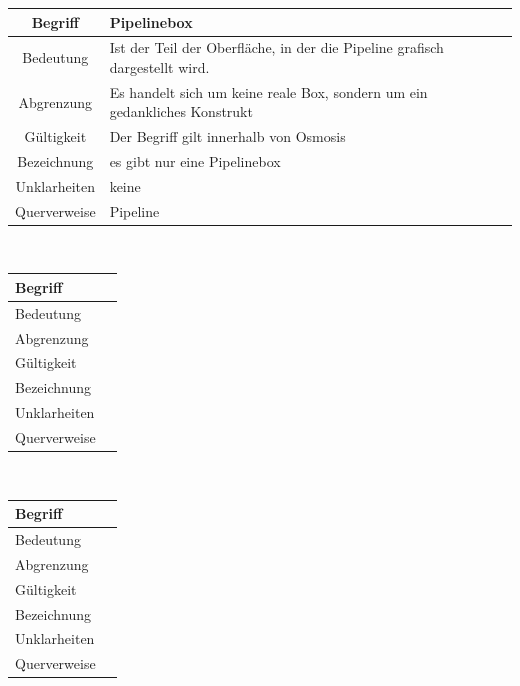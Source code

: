 \documentclass[a4paper,10pt]{scrartcl}
\begin{document}
\begin{tabular}{|c|p{10cm}|}
\hline Begriff & \textbf{Pipelinebox} \\ 
\hline Bedeutung & Ist der Teil der Oberfläche, in der die Pipeline grafisch dargestellt wird. \\ 
\hline Abgrenzung & Es handelt sich um keine reale Box, sondern um ein gedankliches Konstrukt \\ 
\hline Gültigkeit & Der Begriff gilt innerhalb von Osmosis \\ 
\hline Bezeichnung & es gibt nur eine Pipelinebox \\ 
\hline Unklarheiten & keine \\ 
\hline Querverweise & Pipeline \\ 
\hline 
\end{tabular}
\\
\begin{tabular}{|p{5cm}|p{10cm}|}
\hline Begriff &  \\ 
\hline Bedeutung &  \\ 
\hline Abgrenzung &  \\ 
\hline Gültigkeit &  \\ 
\hline Bezeichnung &  \\ 
\hline Unklarheiten &  \\ 
\hline Querverweise &  \\ 
\hline 
\end{tabular}
\\
\begin{tabular}{|p{5cm}|p{10cm}|}
\hline Begriff &  \\ 
\hline Bedeutung &  \\ 
\hline Abgrenzung &  \\ 
\hline Gültigkeit &  \\ 
\hline Bezeichnung &  \\ 
\hline Unklarheiten &  \\ 
\hline Querverweise &  \\ 
\hline 
\end{tabular}
\end{document}
